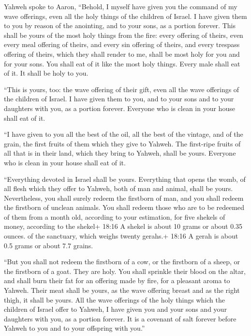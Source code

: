  Yahweh spoke to Aaron, ``Behold, I myself have given you
the command of my wave offerings, even all the holy things of the
children of Israel. I have given them to you by reason of the anointing,
and to your sons, as a portion forever.  This shall be yours
of the most holy things from the fire: every offering of theirs, even
every meal offering of theirs, and every sin offering of theirs, and
every trespass offering of theirs, which they shall render to me, shall
be most holy for you and for your sons.  You shall eat of
it like the most holy things. Every male shall eat of it. It shall be
holy to you.

 ``This is yours, too: the wave offering of their gift,
even all the wave offerings of the children of Israel. I have given them
to you, and to your sons and to your daughters with you, as a portion
forever. Everyone who is clean in your house shall eat of it.

 ``I have given to you all the best of the oil, all the
best of the vintage, and of the grain, the first fruits of them which
they give to Yahweh.  The first-ripe fruits of all that is
in their land, which they bring to Yahweh, shall be yours. Everyone who
is clean in your house shall eat of it.

 ``Everything devoted in Israel shall be yours.
 Everything that opens the womb, of all flesh which they
offer to Yahweh, both of man and animal, shall be yours. Nevertheless,
you shall surely redeem the firstborn of man, and you shall redeem the
firstborn of unclean animals.  You shall redeem those who
are to be redeemed of them from a month old, according to your
estimation, for five shekels of money, according to the shekel+ 18:16 A
shekel is about 10 grams or about 0.35 ounces. of the sanctuary, which
weighs twenty gerahs.+ 18:16 A gerah is about 0.5 grams or about 7.7
grains.

 ``But you shall not redeem the firstborn of a cow, or the
firstborn of a sheep, or the firstborn of a goat. They are holy. You
shall sprinkle their blood on the altar, and shall burn their fat for an
offering made by fire, for a pleasant aroma to Yahweh. 
Their meat shall be yours, as the wave offering breast and as the right
thigh, it shall be yours.  All the wave offerings of the
holy things which the children of Israel offer to Yahweh, I have given
you and your sons and your daughters with you, as a portion forever. It
is a covenant of salt forever before Yahweh to you and to your offspring
with you.''

